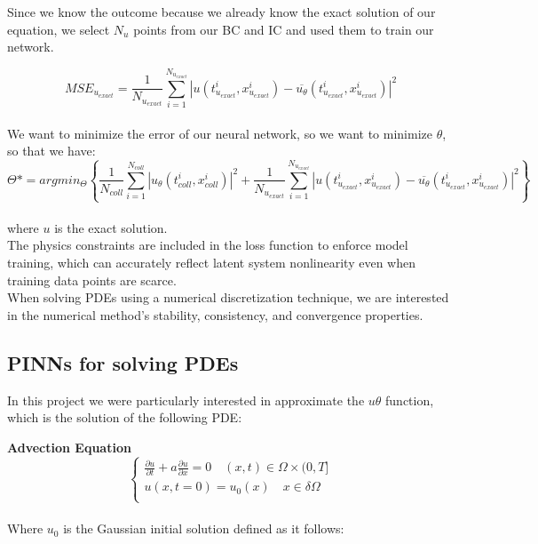 \documentclass{article}
\begin{document}
Since we know the outcome because we already know the exact solution of our equation, we select $N_u$ points from our BC and IC and used them to train our network.

$$MSE_{u_{exact}}=\frac{1}{N_{u_{exact}}}\sum^{N_{u_{exact}}}_{i=1}|u(t_{u_{exact}}^i,x_{u_{exact}}^i)-\overline{u_\theta}(t_{u_{exact}}^i,x_{u_{exact}}^i)|^2$$
\\
We want to minimize the error of our neural network, so we want to minimize $\theta$, so that we have:
\\

$$
\Theta* = argmin_\Theta \left\{ \frac{1}{N_{coll}}\sum^{N_{coll}}_{i=1}|u_\theta(t_{coll}^i,x_{coll}^i)|^2 + \frac{1}{N_{u_{exact}}}\sum^{N_{u_{exact}}}_{i=1}|u(t_{u_{exact}}^i,x_{u_{exact}}^i)-\overline{u_\theta}(t_{u_{exact}}^i,x_{u_{exact}}^i)|^2 \right\}
$$
\\

where $u$ is the exact solution.
\\

The physics constraints are included in the loss function to enforce model training, which can accurately reflect latent system nonlinearity even when training data points are scarce.\\


When solving PDEs using a numerical discretization technique, we are
interested in the numerical method’s stability, consistency, and convergence properties.\\


\subsection{PINNs for solving PDEs} 


In this project we were particularly interested in approximate the $u\theta$ function, which is the solution of the following PDE:

\textbf{Advection Equation}
\begin{equation}
    \begin{cases}
    \frac{\partial u}{\partial t} + a \frac{\partial u}{\partial x} = 0 \quad (x,t) \in \Omega \times (0,T] \\
     u(x,t=0) = u_0(x) \quad x \in \delta \Omega \\
    \end{cases}
\end{equation}
\\
Where $u_0$ is the Gaussian initial solution defined as it follows:
\end{document}
